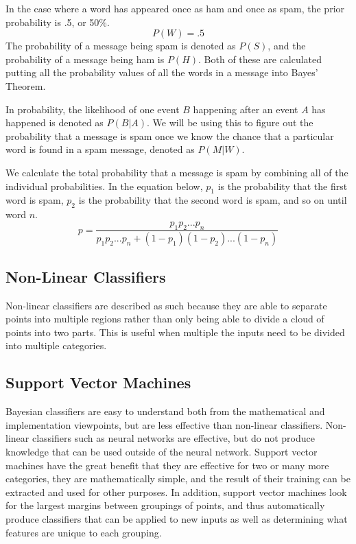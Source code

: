\documentclass[12pt]{article}
\begin{document}
In the case where a word has appeared once as ham and once as spam, the prior probability is .5, or 50\%. 
$$P(W) = .5$$
The probability of a message being spam is denoted as $P(S)$, and the probability of a message being ham is
$P(H)$. Both of these are calculated putting all the probability values of all the words in a message into
Bayes' Theorem.

In probability, the likelihood of one event $B$ happening after an event $A$ has happened is denoted as
$P(B|A)$. We will be using this to figure out the probability that a message is spam once we know the chance
that a particular word is found in a spam message, denoted as $P(M|W)$.

We calculate the total probability that a message is spam by combining all of the individual probabilities.
In the equation below, $p_{1}$ is the probability that the first word is spam, $p_{2}$ is the probability that
the second word is spam, and so on until word $n$.
$$p=\dfrac{p_{1}p_{2} ... p_{n}}{p_{1}p_{2} ... p_{n} + (1-p_{1})(1-p_{2}) ... (1-p_{n})}$$



\subsection{Non-Linear Classifiers}
Non-linear classifiers are described as such because they are able to separate points into multiple regions
rather than only being able to divide a cloud of points into two parts. This is useful when multiple the
inputs need to be divided into multiple categories.
\subsection{Support Vector Machines}
Bayesian classifiers are easy to understand both from the mathematical and implementation viewpoints, but are
less effective than non-linear classifiers. Non-linear classifiers such as neural networks are effective, but
do not produce knowledge that can be used outside of the neural network.  Support vector machines have the
great benefit that they are effective for two or many more categories, they are mathematically simple, and the
result of their training can be extracted and used for other purposes. \cite{hearst1998support} In addition,
support vector machines look for the largest margins between groupings of points, and thus automatically
produce classifiers that can be applied to new inputs as well as determining what features are unique to each
grouping.
\end{document}
